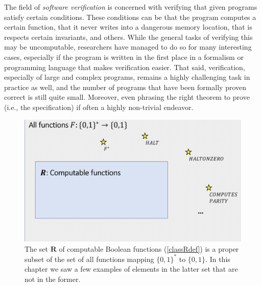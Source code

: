 The field of \emph{software verification} is concerned with verifying
that given programs satisfy certain conditions. These conditions can be
that the program computes a certain function, that it never writes into
a dangerous memory location, that is respects certain invariants, and
others. While the general tasks of verifying this may be uncomputable,
researchers have managed to do so for many interesting cases, especially
if the program is written in the first place in a formalism or
programming language that makes verification easier. That said,
verification, especially of large and complex programs, remains a highly
challenging task in practice as well, and the number of programs that
have been formally proven correct is still quite small. Moreover, even
phrasing the right theorem to prove (i.e., the specification) if often a
highly non-trivial endeavor.


\begin{figure}
\centering
\includegraphics[width=\textwidth, height=0.25\paperheight, keepaspectratio]{../figure/inclusion_noncomputable.png}
\caption{The set \(\mathbf{R}\) of computable Boolean functions
(\cref{classRdef}) is a proper subset of the set of all functions
mapping \(\{0,1\}^*\) to \(\{0,1\}\). In this chapter we saw a few
examples of elements in the latter set that are not in the former.}
\label{inclusionuncomputablefig}
\end{figure}

